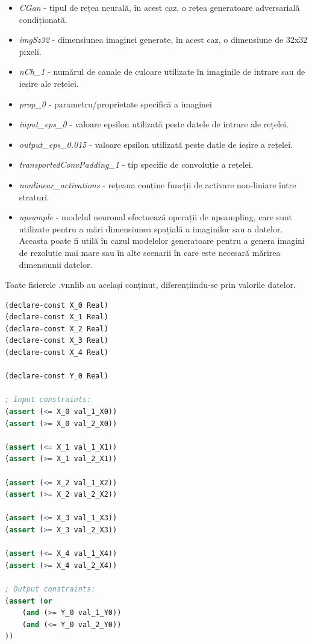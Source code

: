 \begin{itemize}
  \item \textit{CGan} - tipul de rețea neurală, în acest caz, o rețea generatoare adversarială condiționată.
  
  \item \textit{imgSz32} - dimensiunea imaginei generate, în acest caz, o dimensiune de 32x32 pixeli.

  \item \textit{nCh\_1} - numărul de canale de culoare utilizate în imaginile de intrare sau de ieșire ale rețelei.
  
  \item \textit{prop\_0} - parametru/proprietate specifică a imaginei

  \item \textit{input\_eps\_0} - valoare epsilon utilizată peste datele de intrare ale rețelei.
  
  \item \textit{output\_eps\_0.015} -  valoare epsilon utilizată peste datle de ieșire a rețelei.


  \item \textit{transportedConvPadding\_1} - tip specific de convoluție a rețelei.
  
  \item \textit{nonlinear\_activations} - rețeaua conține funcții de activare non-liniare între straturi.

  \item \textit{upsample} - modelul neuronal efectuează operații de upsampling, care sunt utilizate pentru a mări dimensiunea spațială a imaginilor sau a datelor. Aceasta poate fi utilă în cazul modelelor generatoare pentru a genera imagini de rezoluție mai mare sau în alte scenarii în care este necesară mărirea dimensiunii datelor.
  
\end{itemize}

Toate fisierele .vnnlib au același conținut, diferențiindu-se prin valorile datelor.

\begin{lstlisting}[language=Lisp, caption={Exemplu de cod SMT-LIB din fisierele vnnlib}, label={lst:smtlib}, basicstyle=\scriptsize\ttfamily]
(declare-const X_0 Real)
(declare-const X_1 Real)
(declare-const X_2 Real)
(declare-const X_3 Real)
(declare-const X_4 Real)

(declare-const Y_0 Real)

; Input constraints:
(assert (<= X_0 val_1_X0))
(assert (>= X_0 val_2_X0))

(assert (<= X_1 val_1_X1))
(assert (>= X_1 val_2_X1))

(assert (<= X_2 val_1_X2))
(assert (>= X_2 val_2_X2))

(assert (<= X_3 val_1_X3))
(assert (>= X_3 val_2_X3))

(assert (<= X_4 val_1_X4))
(assert (>= X_4 val_2_X4))

; Output constraints:
(assert (or
    (and (>= Y_0 val_1_Y0))
    (and (<= Y_0 val_2_Y0))
))

\end{lstlisting}

